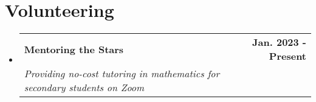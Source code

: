 \documentclass[letterpaper,11pt]{article}
\makeatletter
\newcommand{\resumeItem}[1]{
  \item\small{
    {#1 \vspace{-2pt}}
  }
}
\newcommand{\resumeSubheading}[4]{
  \vspace{-2pt}\item
    \begin{tabular*}{1.0\textwidth}[t]{l@{\extracolsep{\fill}}r}
      \textbf{#1} & \textbf{\small #2} \\
      \textit{\small#3} & \textit{\small #4} \\
    \end{tabular*}\vspace{-7pt}
}
\newcommand{\resumeProjectHeading}[2]{
    \item
    \begin{tabular*}{1.001\textwidth}{l@{\extracolsep{\fill}}r}
      \small#1 & \textbf{\small #2}\\
    \end{tabular*}\vspace{-7pt}
}
\newcommand{\resumeSubHeadingListStart}{\begin{itemize}[leftmargin=0.0in, label={}]}
\newcommand{\resumeSubHeadingListEnd}{\end{itemize}}
\newcommand{\resumeItemListStart}{\begin{itemize}}
\newcommand{\resumeItemListEnd}{\end{itemize}\vspace{-5pt}}
\makeatother
\begin{document}
\section{Volunteering}
\resumeSubHeadingListStart
\resumeSubheading{Mentoring the Stars}{Jan. 2023 - Present}{Providing no-cost tutoring in mathematics for secondary students on Zoom}{}
\resumeSubHeadingListEnd



\end{document}
